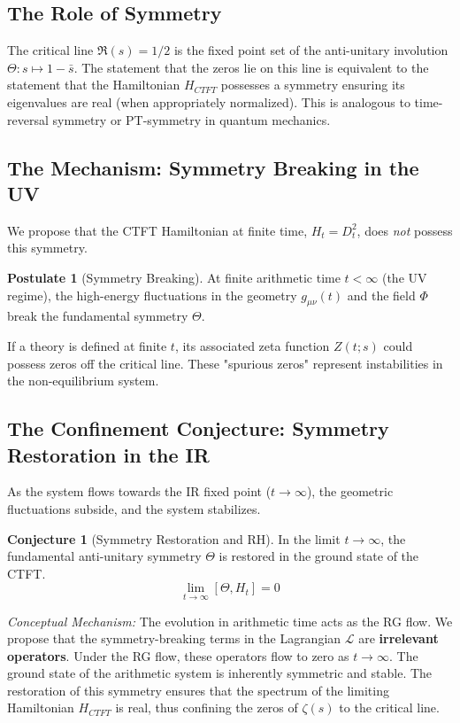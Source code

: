 \documentclass[11pt, a4paper]{article}
\theoremstyle{definition}
\newtheorem{postulate}{Postulate}
\newtheorem{conjecture}{Conjecture}[section]
\newcommand{\Lagr}{\mathcal{L}}
\begin{document}
\subsection{The Role of Symmetry}
The critical line $\Re(s) = 1/2$ is the fixed point set of the anti-unitary involution $\Theta: s \mapsto 1-\bar{s}$. The statement that the zeros lie on this line is equivalent to the statement that the Hamiltonian $H_{CTFT}$ possesses a symmetry ensuring its eigenvalues are real (when appropriately normalized). This is analogous to time-reversal symmetry or PT-symmetry in quantum mechanics.

\subsection{The Mechanism: Symmetry Breaking in the UV}
We propose that the CTFT Hamiltonian at finite time, $H_t = D_t^2$, does \textit{not} possess this symmetry.

\begin{postulate}[Symmetry Breaking]
At finite arithmetic time $t < \infty$ (the UV regime), the high-energy fluctuations in the geometry $g_{\mu\nu}(t)$ and the field $\Phi$ break the fundamental symmetry $\Theta$.
\end{postulate}

If a theory is defined at finite $t$, its associated zeta function $Z(t;s)$ could possess zeros off the critical line. These "spurious zeros" represent instabilities in the non-equilibrium system.

\subsection{The Confinement Conjecture: Symmetry Restoration in the IR}
As the system flows towards the IR fixed point ($t\to\infty$), the geometric fluctuations subside, and the system stabilizes.

\begin{conjecture}[Symmetry Restoration and RH]
In the limit $t\to\infty$, the fundamental anti-unitary symmetry $\Theta$ is restored in the ground state of the CTFT.
$$ \lim_{t\to\infty} [\Theta, H_t] = 0 $$
\end{conjecture}

\textit{Conceptual Mechanism:} The evolution in arithmetic time acts as the RG flow. We propose that the symmetry-breaking terms in the Lagrangian $\Lagr$ are \textbf{irrelevant operators}. Under the RG flow, these operators flow to zero as $t\to\infty$. The ground state of the arithmetic system is inherently symmetric and stable. The restoration of this symmetry ensures that the spectrum of the limiting Hamiltonian $H_{CTFT}$ is real, thus confining the zeros of $\zeta(s)$ to the critical line.
\end{document}
